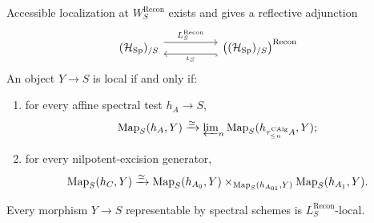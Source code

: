 \begin{theorem}
\label{thm:global-spectral-reconstruction-reflector}
Accessible localization at \(W^{\mathrm{Recon}}_S\) exists and gives a
reflective adjunction
\[
\begin{tikzcd}[column sep=huge]
    (\mathcal H_{\Sp})_{/S}
        \arrow[r,shift left=1.2ex,"L^{\mathrm{Recon}}_S"]
        &
    \bigl((\mathcal H_{\Sp})_{/S}\bigr)^{\mathrm{Recon}}
        \arrow[l,shift left=1.2ex,hook,"\iota_S"]
\end{tikzcd}
\]
An object \(Y\to S\) is local if and only if:
\begin{enumerate}[label=(\roman*)]
    \item for every affine spectral test \(h_A\to S\),
    \[
        \operatorname{Map}_S(h_A,Y)
        \xrightarrow{\simeq}
        \varprojlim\nolimits_n
        \operatorname{Map}_S(h_{\tau_{\leq n}^{\operatorname{CAlg}}A},Y);
    \]
    \item for every nilpotent-excision generator,
    \[
        \operatorname{Map}_S(h_C,Y)
        \xrightarrow{\simeq}
        \operatorname{Map}_S(h_{A_0},Y)
        \times_{\operatorname{Map}_S(h_{A_{01}},Y)}
        \operatorname{Map}_S(h_{A_1},Y).
    \]
\end{enumerate}
Every morphism \(Y\to S\) representable by spectral schemes is
\(L^{\mathrm{Recon}}_S\)-local.
\end{theorem}

